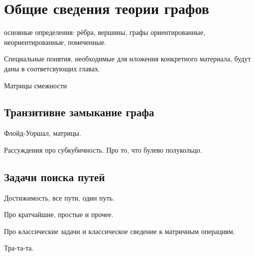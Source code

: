 \section{Общие сведения теории графов}

основные определения: рёбра, вершины, графы ориентированные, неориентированные, помеченные.

Специальные понятия, необходимые для иложения конкретного материала, будут даны в соответсвующих главах.

Матрицы смежности

\subsection{Транзитивне замыкание графа}

Флойд-Уоршал, матрицы.

Рассуждения про субкубичность.
Про то, что булево полукольцо.


\subsection{Задачи поиска путей}

Достижимость, все пути, один путь.

Про кратчайшие, простые и прочее.

Про классические задачи и классическое сведение к матричным операциям.

Тра-та-та.